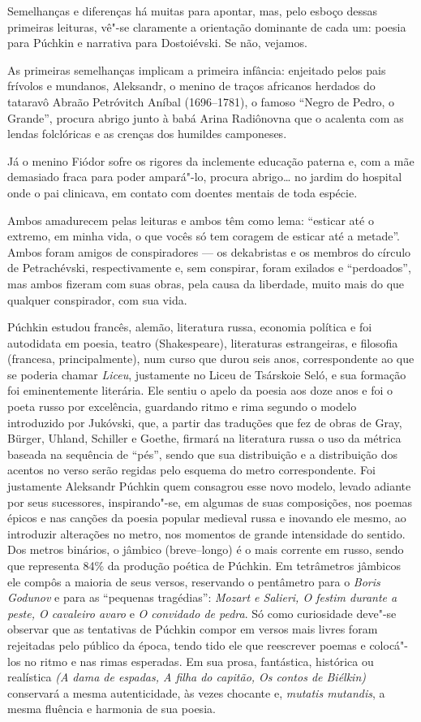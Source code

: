 Semelhanças e diferenças há muitas para apontar, mas, pelo esboço dessas
primeiras leituras, vê"-se claramente a orientação dominante de cada um:
poesia para Púchkin e narrativa para Dostoiévski. Se não, vejamos.

As primeiras semelhanças implicam a primeira infância: enjeitado pelos
pais frívolos e mundanos, Aleksandr, o menino de traços africanos
herdados do tataravô Abraão Petróvitch Aníbal (1696--1781), o famoso
``Negro de Pedro, o Grande'', procura abrigo junto à babá Arina
Radiônovna que o acalenta com as lendas folclóricas e as crenças dos
humildes camponeses.

Já o menino Fiódor sofre os rigores da inclemente educação paterna e, com a
mãe demasiado fraca para poder ampará"-lo, procura abrigo\ldots{} no jardim do
hospital onde o pai clinicava, em contato com doentes mentais de toda espécie.

Ambos amadurecem pelas leituras e ambos têm como lema: ``esticar até o
extremo, em minha vida, o que vocês só tem coragem de esticar até a
metade''. Ambos foram amigos de conspiradores --- os dekabristas e os
membros do círculo de Petrachévski, respectivamente e, sem conspirar,
foram exilados e ``perdoados'', mas ambos fizeram com suas obras, pela
causa da liberdade, muito mais do que qualquer conspirador, com sua
vida.

Púchkin estudou francês, alemão, literatura russa, economia política e
foi autodidata em poesia, teatro (Shakespeare), literaturas
estrangeiras, e filosofia (francesa, principalmente), num curso que
durou seis anos, correspondente ao que se poderia chamar \emph{Liceu},
justamente no Liceu de Tsárskoie Seló, e sua formação foi eminentemente
literária. Ele sentiu o apelo da poesia aos doze anos e foi o poeta
russo por excelência, guardando ritmo e rima segundo o modelo
introduzido por Jukóvski, que, a partir das traduções que fez de obras
de Gray, Bürger, Uhland, Schiller e Goethe, firmará na literatura russa
o uso da métrica baseada na sequência de ``pés'', sendo que sua
distribuição e a distribuição dos acentos no verso serão regidas pelo
esquema do metro correspondente. Foi justamente Aleksandr Púchkin quem
consagrou esse novo modelo, levado adiante por seus sucessores, inspirando"-se, em algumas de suas
composições, nos poemas épicos e nas canções da poesia popular medieval
russa e inovando ele mesmo, ao introduzir alterações no metro, nos
momentos de grande intensidade do sentido. Dos metros binários, o
jâmbico (breve--longo) é o mais corrente em russo, sendo que representa 84\% da
produção poética de Púchkin. Em tetrâmetros jâmbicos ele compôs a
maioria de seus versos, reservando o pentâmetro para o \emph{Boris
Godunov} e para as ``pequenas tragédias'': \emph{Mozart e Salieri,
O festim durante a peste, O cavaleiro avaro} e \emph{O convidado de
pedra}. Só como curiosidade deve"-se observar que as tentativas de
Púchkin compor em versos mais livres foram rejeitadas pelo público da
época, tendo tido ele que reescrever poemas e colocá"-los no ritmo e nas rimas
esperadas. Em sua prosa, fantástica, histórica ou realística \emph{(A
dama de espadas, A filha do capitão, Os contos de Biélkin)} conservará a
mesma autenticidade, às vezes chocante e, \emph{mutatis mutandis}, a
mesma fluência e harmonia de sua poesia.

